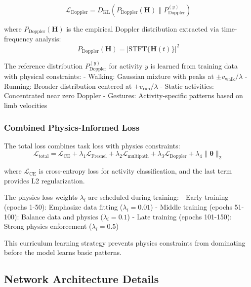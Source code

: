 \documentclass[10pt,journal,compsoc]{IEEEtran}
\begin{document}
\begin{equation}
\mathcal{L}_{\text{Doppler}} = D_{\text{KL}}\left( P_{\text{Doppler}}(\mathbf{H}) \| P_{\text{Doppler}}^{(y)} \right)
\end{equation}

where $P_{\text{Doppler}}(\mathbf{H})$ is the empirical Doppler distribution extracted via time-frequency analysis:
\begin{equation}
P_{\text{Doppler}}(\mathbf{H}) = \left| \text{STFT}\{\mathbf{H}(t)\} \right|^2
\end{equation}

The reference distribution $P_{\text{Doppler}}^{(y)}$ for activity $y$ is learned from training data with physical constraints:
- Walking: Gaussian mixture with peaks at $\pm v_{\text{walk}}/\lambda$
- Running: Broader distribution centered at $\pm v_{\text{run}}/\lambda$  
- Static activities: Concentrated near zero Doppler
- Gestures: Activity-specific patterns based on limb velocities

\subsubsection{Combined Physics-Informed Loss}

The total loss combines task loss with physics constraints:
\begin{equation}
\mathcal{L}_{\text{total}} = \mathcal{L}_{\text{CE}} + \lambda_1 \mathcal{L}_{\text{Fresnel}} + \lambda_2 \mathcal{L}_{\text{multipath}} + \lambda_3 \mathcal{L}_{\text{Doppler}} + \lambda_4 \|\boldsymbol{\theta}\|_2
\end{equation}

where $\mathcal{L}_{\text{CE}}$ is cross-entropy loss for activity classification, and the last term provides L2 regularization.

The physics loss weights $\lambda_i$ are scheduled during training:
- Early training (epochs 1-50): Emphasize data fitting ($\lambda_i = 0.01$)
- Middle training (epochs 51-100): Balance data and physics ($\lambda_i = 0.1$)
- Late training (epochs 101-150): Strong physics enforcement ($\lambda_i = 0.5$)

This curriculum learning strategy prevents physics constraints from dominating before the model learns basic patterns.

\subsection{Network Architecture Details}
\end{document}

